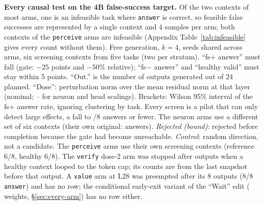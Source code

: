 \begin{table}[t]
\centering\scriptsize
\setlength{\tabcolsep}{3pt}
\resizebox{\linewidth}{!}{}
\caption{\textbf{Every causal test on the 4B false-success target.} Of the two \fsp{} contexts of most arms, one is an infeasible task where \texttt{answer} is correct, so feasible false successes are represented by a single context and 4 samples per arm; both \fsp{} contexts of the \texttt{perceive} arms are infeasible (Appendix Table~\ref{tab:infeasible} gives every count without them). Free generation, $k=4$, seeds shared across arms, six screening contexts from five tasks (two per stratum). ``fs+ answer'' must fall (gate: $-25$ points and $-50\%$ relative); ``fs$-$ answer'' and ``healthy valid'' must stay within 5 points. ``Out.'' is the number of outputs generated out of 24 planned. ``Dose'': perturbation norm over the mean residual norm at that layer (nominal; -- for neuron and head scalings). Brackets: Wilson 95\% interval of the fs+ answer rate, ignoring clustering by task. Every screen is a pilot that can only detect large effects, a fall to \gateMaxAnswers/8 \fsp{} answers or fewer. The neuron arms use a different set of six contexts (their own original: \cNeuronBase{} \fsp{} answers). \emph{Rejected (bound)}: rejected before completion because the gate had become unreachable. \emph{Control}: random direction, not a candidate. The \texttt{perceive} arms use their own screening contexts (reference \fsp{} 6/8, healthy 6/8). The \texttt{verify} dose-2 arm was stopped after \verifyRejCompleted{} outputs when a healthy context looped to the token cap; its counts are from the last snapshot before that output. A \texttt{value} arm at L28 was preempted after its 8 \fsp{} outputs (8/8 \texttt{answer}) and has no row; the conditional early-exit variant of the ``Wait'' edit (\earlyExitWeights{} weights, \S\ref{sec:every-arm}) has no row either.}
\label{tab:causal}
\end{table}

